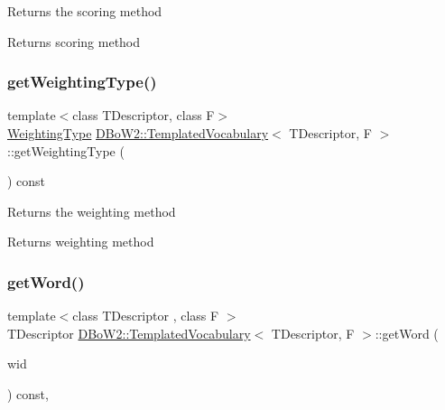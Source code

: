 Returns the scoring method \begin{DoxyReturn}{Returns}
scoring method 
\end{DoxyReturn}
\mbox{\label{class_d_bo_w2_1_1_templated_vocabulary_aadb9343da87e0f00ed3da401c59132b2}} 
\subsubsection{\texorpdfstring{get\+Weighting\+Type()}{getWeightingType()}}
{\footnotesize\ttfamily template$<$class T\+Descriptor, class F$>$ \\
\mbox{\hyperlink{namespace_d_bo_w2_a5de5c8a307aca9a84ffefda2a9bc467a}{Weighting\+Type}} \mbox{\hyperlink{class_d_bo_w2_1_1_templated_vocabulary}{D\+Bo\+W2\+::\+Templated\+Vocabulary}}$<$ T\+Descriptor, F $>$\+::get\+Weighting\+Type (\begin{DoxyParamCaption}{ }\end{DoxyParamCaption}) const\hspace{0.3cm}{\ttfamily [inline]}}

Returns the weighting method \begin{DoxyReturn}{Returns}
weighting method 
\end{DoxyReturn}
\mbox{\label{class_d_bo_w2_1_1_templated_vocabulary_a3f0d8b15b4f673bf9888ff23489430b4}} 
\subsubsection{\texorpdfstring{get\+Word()}{getWord()}}
{\footnotesize\ttfamily template$<$class T\+Descriptor , class F $>$ \\
T\+Descriptor \mbox{\hyperlink{class_d_bo_w2_1_1_templated_vocabulary}{D\+Bo\+W2\+::\+Templated\+Vocabulary}}$<$ T\+Descriptor, F $>$\+::get\+Word (\begin{DoxyParamCaption}\item[{\mbox{\hyperlink{namespace_d_bo_w2_ab1a0d3283b2d4690a383372ed20bfeb5}{Word\+Id}}}]{wid }\end{DoxyParamCaption}) const\hspace{0.3cm}{\ttfamily [inline]}, {\ttfamily [virtual]}}

